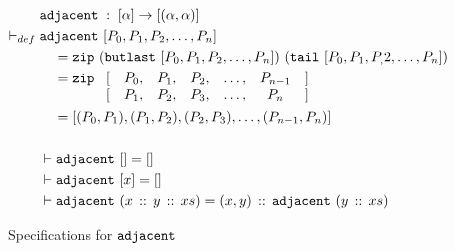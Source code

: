 \begin{figure}
\begin{align*}
  &\code{adjacent}\; : \; [\alpha] \rightarrow [(\alpha,\alpha)]\\
  \vdash_{def}\;&\code{adjacent}\ [P_0,P_1,P_2,\ldots,P_n]\\
  &\quad=\code{zip}\ (\code{butlast}\ [P_0,P_1,P_2,\ldots,P_n])\ (\code{tail}\ [P_0,P_1,P_,2,\ldots,P_n])\\
  &\quad= \code{zip}\ \begin{array}[t]{rcccccl}\lbrack & P_0,&P_1,&P_2,&\ldots,&P_{n-1}&\rbrack\\
    \lbrack & P_1,&P_2,&P_3,&\ldots,&P_n&\rbrack
  \end{array}\\
  &\quad= [(P_0,P_1),(P_1,P_2),(P_2,P_3),\ldots,(P_{n-1},P_n)]\\\\
  &\vdash\code{adjacent}\ [] = []\\
  &\vdash\code{adjacent}\ [x] = []\\
  &\vdash\code{adjacent}\ (\cons{x}{\cons{y}{xs}}) = \cons{(x,y)}{\code{adjacent}\ (\cons{y}{xs})}
\end{align*}
\caption{Specifications for $\texttt{adjacent}$}
\label{fig:AdjacentSpec}
\end{figure}

